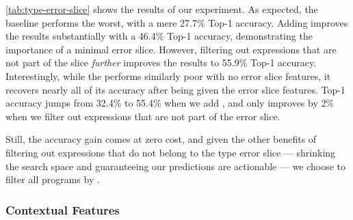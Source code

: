 \autoref{tab:type-error-slice} shows the results of our experiment.
%
As expected, the baseline performs the worst, with a mere 27.7\% \linear
Top-1 accuracy.
%
Adding \InSlice improves the results substantially with a 46.4\% \linear Top-1
accuracy, demonstrating the importance of a minimal error slice.
%
However, filtering out expressions that are not part of the slice
\emph{further} improves the results to 55.9\% \linear Top-1 accuracy.
%
Interestingly, while the \hiddenFH performs similarly poor with no error
slice features, it recovers nearly all of its accuracy after being given
the error slice features.
%
Top-1 accuracy jumps from 32.4\% to 55.4\% when we add \InSlice, and only
improves by 2\% when we filter out expressions that are not part of the
error slice.

Still, the accuracy gain comes at zero cost, and given the other benefits
of filtering out expressions that do not belong to the type error slice
--- shrinking the search space and guaranteeing our predictions are actionable ---
we choose to filter all programs by \InSlice.

\subsubsection{Contextual Features}
\label{sec:contextual-features}

